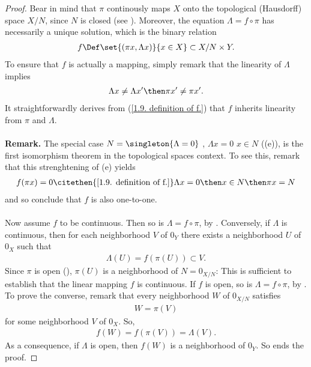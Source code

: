 \begin{proof} Bear in mind that 
%
  $\pi$ continously maps $X$ onto the topological (Hausdorff) space $X/N$, 
  since $N$ is closed (see ).
%
Moreover, the equation 
% 
  $\Lambda = f \circ \pi$ 
% 
has necessarily a unique solution, which is the binary relation 
%
  \begin{align}\label{1.9. definition of f.}
     f \Def\set{(\pi x, \Lambda x)}{x \in X} \subset X/N \times Y.
    \end{align}
%
To ensure that $f$ is actually a mapping, simply remark that 
the linearity of $\Lambda$ implies 
%
  \begin{align}
    \Lambda x \neq \Lambda  x' \then \pi x' \neq \pi x'.
  \end{align}
%
It straightforwardly derives from (\ref{1.9. definition of f.}) that 
$f$ inherits linearity from $\pi$ and $\Lambda$.\\
\\ 
{\bf Remark.} The special case 
%
  $N = \singleton{\Lambda = 0}$ , \ie $\Lambda x= 0$ \iif $x\in N$ (\cf (e)), %
%
is the first isomorphism theorem in the topological spaces context. 
To see this, remark that this strenghtening of (e) yields 
%
  \begin{align}
    f(\pi x) = 0
      \citethen{\ref{1.9. definition of f.}}
    \Lambda x = 0
      \then 
    x \in N 
      \then 
    \pi x = N
\end{align}
and so conclude that $f$ is also one-to-one.
%
%
%
\\\\
Now assume $f$ to be continuous. Then so is 
%
  $\Lambda = f\circ \pi $, 
% 
by . 
%
Conversely, 
%
if $\Lambda$ is continuous, then for each neighborhood $V$ of $0_Y$ 
there exists a neighborhood $U$ of $0_X$ such that
%
  \begin{align}
    \Lambda(U) = f\left(\pi(U)\right) 
      \subset 
    V.
  \end{align}
%
Since $\pi$ is open (), $\pi(U)$ is a neighborhood of 
%
  $N=0_{X/N}$: 
This is sufficient to establish that the linear mapping $f$ is continuous.
%
If $f$ is open, so is $\Lambda = f\circ \pi$, by . 
%
To prove the converse, remark that 
%
  every neighborhood $W$ of $0_{X/N}$ satisfies %
%
  \begin{align}
    W = \pi(V)
  \end{align}
%
for some neighborhood $V$ of $0_X$. So, 
%
  \begin{align}
    f(W) = f \left(\pi(V)\right) = \Lambda(V).
  \end{align}
%
As a consequence, 
% 
  if $\Lambda$ is open, then $f(W)$ is a neighborhood of $0_Y$. %
%
So ends the proof.
\end{proof}


